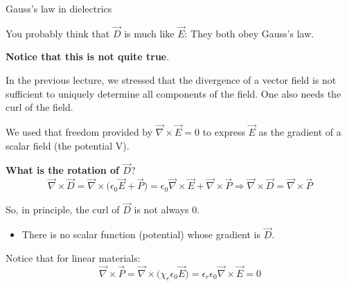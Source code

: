 %
%
%

\begin{frame}{Gauss's law in dielectrics}

{\small

You probably think that $\vec{D}$ is much like $\vec{E}$: They both obey Gauss's law. \\
\vspace{0.1cm}

{\bf Notice that this is not quite true}.\\
\vspace{0.1cm}

In the previous lecture, we stressed that the divergence of a vector field
is not sufficient to uniquely determine all components of the field.
One also needs the curl of the field.\\
\vspace{0.2cm}

We used that freedom provided by $\vec{\nabla} \times \vec{E} = 0$
to express $\vec{E}$ as the gradient of a scalar field (the potential V).\\
\vspace{0.2cm}

{\bf What is the rotation of $\vec{D}$}?\\
\begin{equation*}
   \vec{\nabla} \times \vec{D} =
   \vec{\nabla} \times \Big( \epsilon_0 \vec{E} + \vec{P} \Big) =
   \epsilon_0  \vec{\nabla} \times \vec{E} + \vec{\nabla} \times \vec{P} \Rightarrow
   \vec{\nabla} \times \vec{D} = \vec{\nabla} \times \vec{P}
\end{equation*}

So, in principle, the curl of $\vec{D}$ is not always 0.
\begin{itemize}
   \item There is no scalar function (potential) whose gradient is $\vec{D}$.
\end{itemize}

Notice that for linear materials:
\begin{equation*}
  \vec{\nabla} \times \vec{P} =
  \vec{\nabla} \times \Big( \chi_{e} \epsilon_0 \vec{E} \Big) =
  \epsilon_{r} \epsilon_0 \vec{\nabla} \times \vec{E} = 0
\end{equation*}

}

\end{frame}

%
%
%

